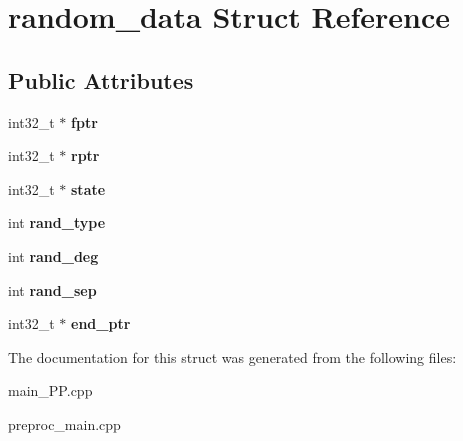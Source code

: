 \hypertarget{structrandom__data}{\section{random\+\_\+data Struct Reference}
\label{structrandom__data}
}
\subsection*{Public Attributes}
\begin{DoxyCompactItemize}
\item 
\hypertarget{structrandom__data_a59a8582e023cad80f2033bf59ea565fc}{int32\+\_\+t $\ast$ {\bfseries fptr}}\label{structrandom__data_a59a8582e023cad80f2033bf59ea565fc}

\item 
\hypertarget{structrandom__data_a2367785f0cbdec31afdc6573a337737e}{int32\+\_\+t $\ast$ {\bfseries rptr}}\label{structrandom__data_a2367785f0cbdec31afdc6573a337737e}

\item 
\hypertarget{structrandom__data_a19bbfd2e35361a4c9338a9ceededece0}{int32\+\_\+t $\ast$ {\bfseries state}}\label{structrandom__data_a19bbfd2e35361a4c9338a9ceededece0}

\item 
\hypertarget{structrandom__data_aa461e823ad2f86ee9fe874e748a24c38}{int {\bfseries rand\+\_\+type}}\label{structrandom__data_aa461e823ad2f86ee9fe874e748a24c38}

\item 
\hypertarget{structrandom__data_a0119d1eb1140a9a0a18876f40727de8c}{int {\bfseries rand\+\_\+deg}}\label{structrandom__data_a0119d1eb1140a9a0a18876f40727de8c}

\item 
\hypertarget{structrandom__data_a9182e517545b2f5d6a5c8e488e027f9b}{int {\bfseries rand\+\_\+sep}}\label{structrandom__data_a9182e517545b2f5d6a5c8e488e027f9b}

\item 
\hypertarget{structrandom__data_addcce01926b8825282f73b8120282b1d}{int32\+\_\+t $\ast$ {\bfseries end\+\_\+ptr}}\label{structrandom__data_addcce01926b8825282f73b8120282b1d}

\end{DoxyCompactItemize}


The documentation for this struct was generated from the following files\+:\begin{DoxyCompactItemize}
\item 
main\+\_\+\+P\+P.\+cpp\item 
preproc\+\_\+main.\+cpp\end{DoxyCompactItemize}
